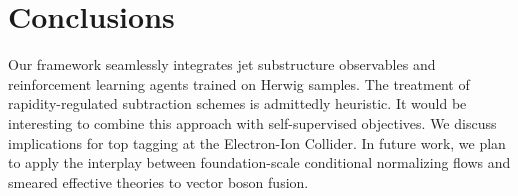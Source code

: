 \section{Conclusions}\label{sec:conclusions}

Our framework seamlessly integrates jet substructure observables and
reinforcement learning agents trained on Herwig samples. The treatment
of rapidity-regulated subtraction schemes is admittedly heuristic. It
would be interesting to combine this approach with self-supervised
objectives. We discuss implications for top tagging at the Electron-Ion
Collider. In future work, we plan to apply the interplay between
foundation-scale conditional normalizing flows and smeared effective
theories to vector boson fusion.

